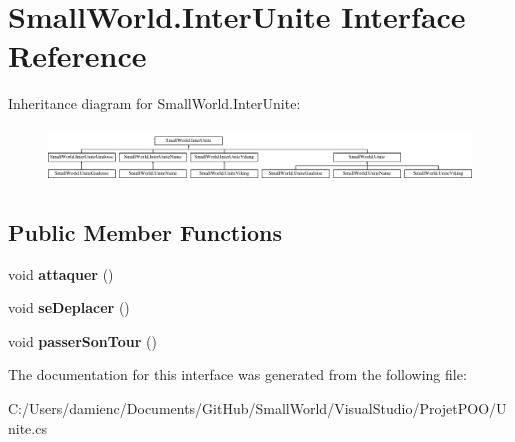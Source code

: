 \hypertarget{interface_small_world_1_1_inter_unite}{\section{Small\-World.\-Inter\-Unite Interface Reference}
\label{interface_small_world_1_1_inter_unite}
}
Inheritance diagram for Small\-World.\-Inter\-Unite\-:\begin{figure}[H]
\begin{center}
\leavevmode
\includegraphics[height=1.481482cm]{interface_small_world_1_1_inter_unite}
\end{center}
\end{figure}
\subsection*{Public Member Functions}
\begin{DoxyCompactItemize}
\item 
\hypertarget{interface_small_world_1_1_inter_unite_a1a5d372f4b0e3df0729649ea0ffef763}{void {\bfseries attaquer} ()}\label{interface_small_world_1_1_inter_unite_a1a5d372f4b0e3df0729649ea0ffef763}

\item 
\hypertarget{interface_small_world_1_1_inter_unite_ae1da4b8c1f3b73e7a24485681466eae7}{void {\bfseries se\-Deplacer} ()}\label{interface_small_world_1_1_inter_unite_ae1da4b8c1f3b73e7a24485681466eae7}

\item 
\hypertarget{interface_small_world_1_1_inter_unite_a85f255866facbcac8eadf00c228f2835}{void {\bfseries passer\-Son\-Tour} ()}\label{interface_small_world_1_1_inter_unite_a85f255866facbcac8eadf00c228f2835}

\end{DoxyCompactItemize}


The documentation for this interface was generated from the following file\-:\begin{DoxyCompactItemize}
\item 
C\-:/\-Users/damienc/\-Documents/\-Git\-Hub/\-Small\-World/\-Visual\-Studio/\-Projet\-P\-O\-O/Unite.\-cs\end{DoxyCompactItemize}
